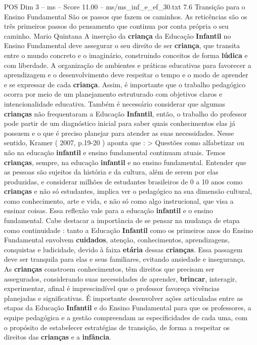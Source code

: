 \begin{textsample}{POS Dim 3 – ms – Score 11.00 – ms/ms\_inf\_e\_ef\_30.txt}  \label{ex:f3_pos_199}
7.6 Transição para o Ensino Fundamental São os passos que fazem os caminhos.
As reticências são os três primeiros passos do pensamento que continua por conta própria o seu caminho.
Mario Quintana A inserção da \textbf{criança} da Educação \textbf{Infantil} no Ensino Fundamental deve assegurar o seu direito de ser \textbf{criança}, que transita entre o mundo concreto e o imaginário, construindo conceitos de forma \textbf{lúdica} e com liberdade.
A organização de ambientes e práticas educativas para favorecer a aprendizagem e o desenvolvimento deve respeitar o tempo e o modo de aprender e se expressar de cada \textbf{criança}.
Assim, é importante que o trabalho pedagógico ocorra por meio de um planejamento estruturado com objetivos claros e intencionalidade educativa.
Também é necessário considerar que algumas \textbf{crianças} não frequentaram a Educação \textbf{Infantil}, então, o trabalho do professor pode partir de um diagnóstico inicial para saber quais conhecimentos elas já possuem e o que é preciso planejar para atender as suas necessidades.
Nesse sentido, Kramer ( 2007, p.19-20 ) aponta que : > Questões como alfabetizar ou não na educação \textbf{infantil} e ensino fundamental continuam atuais.
Temos \textbf{crianças}, sempre, na educação \textbf{infantil} e no ensino fundamental.
Entender que as pessoas são sujeitos da história e da cultura, além de serem por elas produzidas, e considerar milhões de estudantes brasileiros de 0 a 10 anos como \textbf{crianças} e não só estudantes, implica ver o pedagógico na sua dimensão cultural, como conhecimento, arte e vida, e não só como algo instrucional, que visa a ensinar coisas.
Essa reflexão vale para a educação \textbf{infantil} e o ensino fundamental.
Cabe destacar a importância de se pensar na mudança de etapa como continuidade : tanto a Educação \textbf{Infantil} como os primeiros anos do Ensino Fundamental envolvem \textbf{cuidados}, atenção, conhecimentos, aprendizagens, conquistas e ludicidade, devido à faixa \textbf{etária} dessas \textbf{crianças}.
Essa passagem deve ser tranquila para elas e seus familiares, evitando ansiedade e insegurança.
As \textbf{crianças} constroem conhecimentos, têm direitos que precisam ser assegurados, considerando suas necessidades de aprender, \textbf{brincar}, interagir, experimentar, afinal é imprescindível que o professor favoreça vivências planejadas e significativas.
É importante desenvolver ações articuladas entre as etapas da Educação \textbf{Infantil} e do Ensino Fundamental para que os professores, a equipe pedagógica e a gestão compreendam as especificidades de cada uma, com o propósito de estabelecer estratégias de transição, de forma a respeitar os direitos das \textbf{crianças} e a \textbf{infância}.

\end{textsample}
